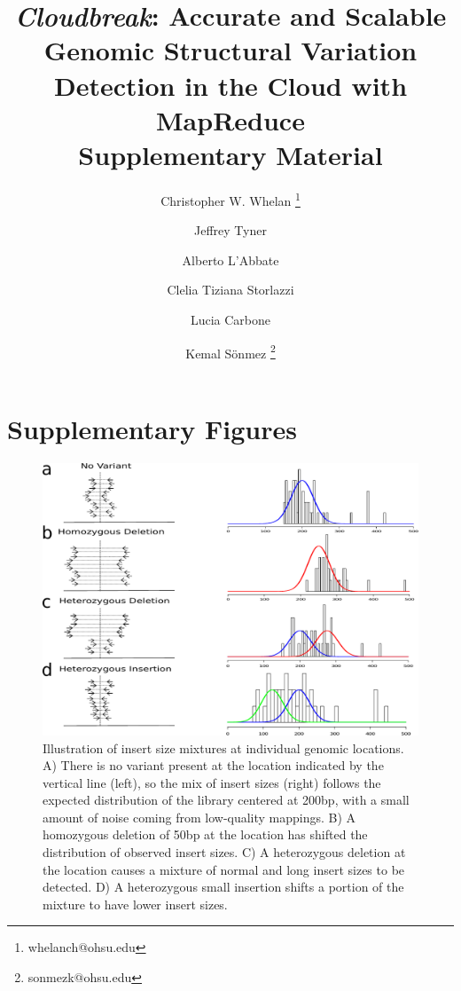 \documentclass[11pt]{article}
\begin{document}
\title{{\em Cloudbreak}: Accurate and Scalable Genomic Structural Variation Detection in the Cloud with MapReduce \\
Supplementary Material}

\author[1,5]{Christopher W. Whelan \thanks{whelanch@ohsu.edu}}
\author[3,4]{Jeffrey Tyner}
\author[6]{Alberto L'Abbate}
\author[6]{Clelia Tiziana Storlazzi}
\author[4,5]{Lucia Carbone}
\author[1,2,5]{Kemal S\"onmez \thanks{sonmezk@ohsu.edu}}

\maketitle

\tableofcontents

\newpage

\section{Supplementary Figures} 

\begin{figure}[h]
\centering
\includegraphics[width=1\textwidth]{../../figures/insert_size_mixtures.pdf}
\caption{Illustration of insert size mixtures at individual genomic locations. A) There is no variant present at the location indicated by the vertical line (left), so the mix of insert sizes (right) follows the expected distribution of the library centered at 200bp, with a small amount of noise coming from low-quality mappings. B) A homozygous deletion of 50bp at the location has shifted the distribution of observed insert sizes. C) A heterozygous deletion at the location causes a mixture of normal and long insert sizes to be detected. D) A heterozygous small insertion shifts a portion of the mixture to have lower insert sizes.}
\label{insert_size_mixes}
\end{figure}
\end{document}
